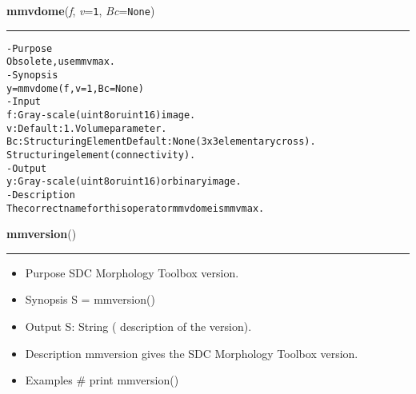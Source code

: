     \begin{boxedminipage}{\textwidth}

    \raggedright \textbf{mmvdome}(\textit{f}, \textit{v}=\texttt{1\-}, \textit{Bc}=\texttt{N\-o\-n\-e\-})

    \vspace{-1.5ex}

    \rule{\textwidth}{0.5\fboxrule}
\begin{alltt}
- Purpose
    Obsolete, use mmvmax.
- Synopsis
    y = mmvdome(f, v=1, Bc=None)
- Input
    f:  Gray-scale (uint8 or uint16) image.
    v:  Default: 1. Volume parameter.
    Bc: Structuring Element Default: None (3x3 elementary cross).
        Structuring element (connectivity).
- Output
    y: Gray-scale (uint8 or uint16) or binary image.
- Description
    The correct name for this operator mmvdome is mmvmax.\end{alltt}

    \vspace{1ex}

    \end{boxedminipage}

    \label{multireg:num_pymorph:mmversion}
    \vspace{0.5ex}

    \begin{boxedminipage}{\textwidth}

    \raggedright \textbf{mmversion}()

    \vspace{-1.5ex}

    \rule{\textwidth}{0.5\fboxrule}
    \begin{itemize}
    \setlength{\parskip}{0.6ex}
      \item Purpose SDC Morphology Toolbox version.

      \item Synopsis S = mmversion()

      \item Output S: String ( description of the version).

      \item Description mmversion gives the SDC Morphology Toolbox version.

      \item Examples \# print mmversion()

    \end{itemize}

    \vspace{1ex}

    \end{boxedminipage}

